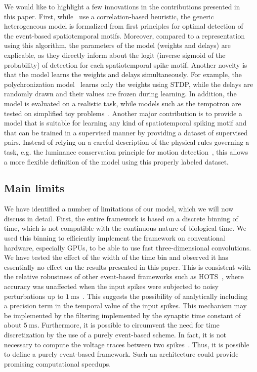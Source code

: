 \documentclass[default]{sn-jnl}%
\theoremstyle{thmstyleone}%
\theoremstyle{thmstyletwo}%
\theoremstyle{thmstylethree}%
\newcommand{\ms}{\si{\milli\second}}%
\begin{document}
We would like to highlight a few innovations in the contributions presented in this paper. First, while~\citep{ghosh_spatiotemporal_2019,yu_stsc-snn_2022} use a correlation-based heuristic, the generic heterogeneous model is formalized from first principles for optimal detection of the event-based spatiotemporal motifs. Moreover, compared to a representation using this algorithm, the parameters of the model (weights and delays) are explicable, as they directly inform about the logit (inverse sigmoid of the probability) of detection for each spatiotemporal spike motif. Another novelty is that the model learns the weights and delays simultaneously. For example, the polychronization model~\citep{izhikevich_polychronization_2006} learns only the weights using STDP, while the delays are randomly drawn and their values are frozen during learning. In addition, the model is evaluated on a realistic task, while models such as the tempotron are tested on simplified toy problems~\citep{gutig_tempotron_2006}. Another major contribution is to provide a model that is suitable for learning any kind of spatiotemporal spiking motif and that can be trained in a supervised manner by providing a dataset of supervised pairs. Instead of relying on a careful description of the physical rules governing a task, e.g. the luminance conservation principle for motion detection~\citep{benosman_asynchronous_2012, dardelet_event-by-event_2021}, this allows a more flexible definition of the model using this properly labeled dataset.
%
\subsection{Main limits}
We have identified a number of limitations of our model, which we will now discuss in detail. First, the entire framework is based on a discrete binning of time, which is not compatible with the continuous nature of biological time. We used this binning to efficiently implement the framework on conventional hardware, especially GPUs, to be able to use fast three-dimensional convolutions. We have tested the effect of the width of the time bin and observed it has essentially no effect on the results presented in this paper. This is consistent with the relative robustness of other event-based frameworks such as HOTS~\citep{lagorce_hots_2017}, where accuracy was unaffected when the input spikes were subjected to noisy perturbations up to $1~\ms$~\citep{grimaldi_robust_2022}. This suggests the possibility of analytically including a precision term in the temporal value of the input spikes. This mechanism may be implemented by the filtering implemented by the synaptic time constant of about $5~\ms$. Furthermore, it is possible to circumvent the need for time discretization by the use of a purely event-based scheme. In fact, it is not necessary to compute the voltage traces between two spikes~\citep{hanuschkin_general_2010}. Thus, it is possible to define a purely event-based framework. Such an architecture could provide promising computational speedups.
\end{document}
